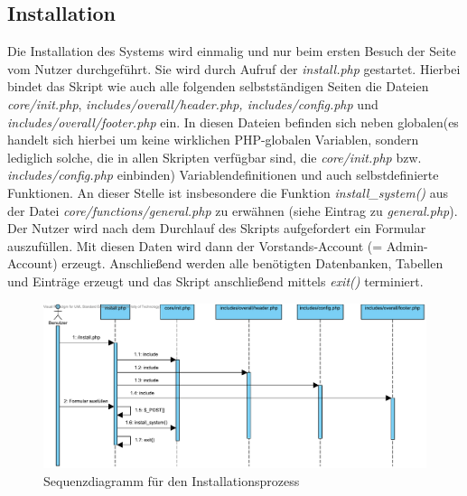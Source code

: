 \documentclass[fontsize = 12pt, paper = a4]{scrreprt}
\begin{document}
\subsection{Installation}
Die Installation des Systems wird einmalig und nur beim ersten Besuch der Seite vom Nutzer durchgeführt. Sie wird durch Aufruf der \textit{install.php} gestartet. Hierbei bindet das Skript wie auch alle folgenden selbstständigen Seiten die Dateien \textit{core/init.php}, \textit{includes/overall/header.php, includes/config.php} und \textit{includes/overall/footer.php} ein. In diesen Dateien befinden sich neben \glqq globalen\grqq (es handelt sich hierbei um keine wirklichen PHP-globalen Variablen, sondern lediglich solche, die in allen Skripten verfügbar sind, die \textit{core/init.php} bzw. \textit{includes/config.php} einbinden) Variablendefinitionen und auch selbstdefinierte Funktionen. An dieser Stelle ist insbesondere die Funktion \textit{install\_system()} aus der Datei \textit{core/functions/general.php} zu erwähnen (siehe Eintrag zu \textit{general.php}).\\
Der Nutzer wird nach dem Durchlauf des Skripts aufgefordert ein Formular auszufüllen. Mit diesen Daten wird dann der Vorstands-Account (= Admin-Account) erzeugt. Anschließend werden alle benötigten Datenbanken, Tabellen und Einträge erzeugt und das Skript anschließend mittels \textit{exit()} terminiert.

\begin{figure}[h]
\centering
\includegraphics[scale = 0.6]{installation}
\caption[Sequenzdiagramm f\"{u}r den Installationsprozess]{Sequenzdiagramm f\"{u}r den Installationsprozess}
\label{install}
\end{figure}

\newpage
\end{document}

